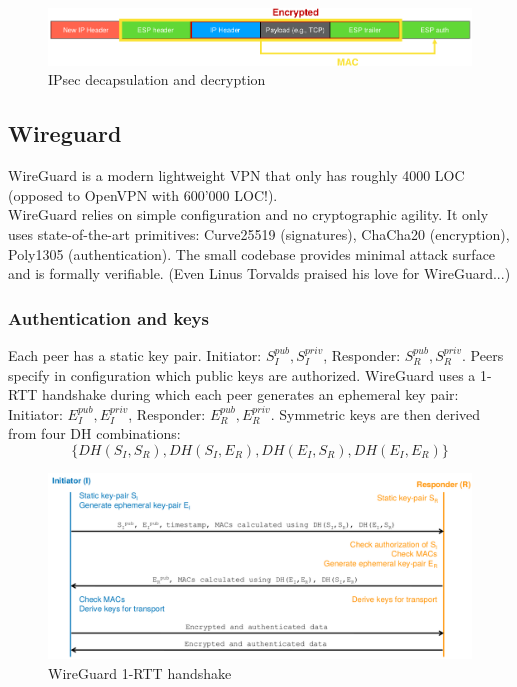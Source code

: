 \documentclass[11pt,oneside,a4paper]{article}
\begin{document}
\begin{figure}[hb]
	\centering
	\includegraphics[width=0.7\linewidth]{figures/ipsec_decapsulation}
	\caption{IPsec decapsulation and decryption}
	\label{fig:ipsecdecapsulation}
\end{figure}

\subsection{Wireguard}

WireGuard is a modern lightweight VPN that only has roughly 4000 LOC (opposed to OpenVPN with 600'000 LOC!).\\
WireGuard relies on simple configuration and no cryptographic agility. It only uses state-of-the-art primitives: Curve25519 (signatures), ChaCha20 (encryption), Poly1305 (authentication). The small codebase provides minimal attack surface and is formally verifiable. (Even Linus Torvalds praised his love for WireGuard...)

\subsubsection{Authentication and keys}

Each peer has a static key pair. Initiator: $S_I^{pub}, S_I^{priv}$, Responder: $S_R^{pub}, S_R^{priv}$. Peers specify in configuration which public keys are authorized. WireGuard uses a 1-RTT handshake during which each peer generates an ephemeral key pair: Initiator: $E_I^{pub}, E_I^{priv}$, Responder: $E_R^{pub}, E_R^{priv}$. Symmetric keys are then derived from four DH combinations: $$\{DH(S_I,S_R), DH(S_I,E_R), DH(E_I,S_R), DH(E_I,E_R)\}$$

\begin{figure}[hb]
	\centering
	\includegraphics[width=1\linewidth]{figures/wireguard_handshake}
	\caption{WireGuard 1-RTT handshake}
	\label{fig:wireguardhandshake}
\end{figure}
\end{document}
